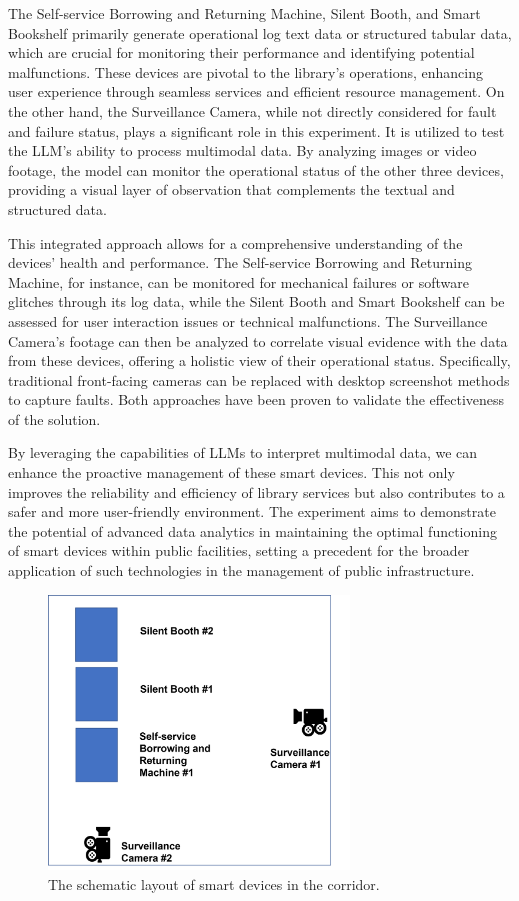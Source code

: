 \documentclass[preprint,12pt]{elsarticle}
\begin{document}
The Self-service Borrowing and Returning Machine, Silent Booth, and Smart Bookshelf primarily generate operational log text data or structured tabular data, which are crucial for monitoring their performance and identifying potential malfunctions. These devices are pivotal to the library's operations, enhancing user experience through seamless services and efficient resource management. On the other hand, the Surveillance Camera, while not directly considered for fault and failure status, plays a significant role in this experiment. It is utilized to test the LLM's ability to process multimodal data. By analyzing images or video footage, the model can monitor the operational status of the other three devices, providing a visual layer of observation that complements the textual and structured data.

This integrated approach allows for a comprehensive understanding of the devices' health and performance. The Self-service Borrowing and Returning Machine, for instance, can be monitored for mechanical failures or software glitches through its log data, while the Silent Booth and Smart Bookshelf can be assessed for user interaction issues or technical malfunctions. The Surveillance Camera's footage can then be analyzed to correlate visual evidence with the data from these devices, offering a holistic view of their operational status. Specifically, traditional front-facing cameras can be replaced with desktop screenshot methods to capture faults. Both approaches have been proven to validate the effectiveness of the solution.

By leveraging the capabilities of LLMs to interpret multimodal data, we can enhance the proactive management of these smart devices. This not only improves the reliability and efficiency of library services but also contributes to a safer and more user-friendly environment. The experiment aims to demonstrate the potential of advanced data analytics in maintaining the optimal functioning of smart devices within public facilities, setting a precedent for the broader application of such technologies in the management of public infrastructure.


\begin{figure}[!h]
	\centering
	\includegraphics[width=8cm]{corridor.png}
	\caption{The schematic layout of smart devices in the corridor.}
	\label{corridor}
\end{figure}
\end{document}
